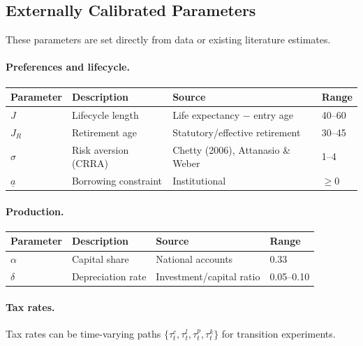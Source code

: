 \subsection{Externally Calibrated Parameters}

These parameters are set directly from data or existing literature estimates.

\paragraph{Preferences and lifecycle.}

\begin{table}[H]
\centering
\small
\begin{tabular}{llll}
\toprule
Parameter & Description & Source & Range \\
\midrule
$J$ & Lifecycle length & Life expectancy $-$ entry age & 40--60 \\
$J_R$ & Retirement age & Statutory/effective retirement & 30--45 \\
$\sigma$ & Risk aversion (CRRA) & Chetty (2006), Attanasio \& Weber & 1--4 \\
$\underline{a}$ & Borrowing constraint & Institutional & $\geq 0$ \\
\bottomrule
\end{tabular}
\end{table}

\paragraph{Production.}

\begin{table}[H]
\centering
\small
\begin{tabular}{llll}
\toprule
Parameter & Description & Source & Range \\
\midrule
$\alpha$ & Capital share & National accounts & 0.33 \\
$\delta$ & Depreciation rate & Investment/capital ratio & 0.05--0.10 \\
\bottomrule
\end{tabular}
\end{table}

\paragraph{Tax rates.}
Tax rates can be time-varying paths $\{\tau^c_t, \tau^l_t, \tau^p_t, \tau^k_t\}$ for transition experiments.

